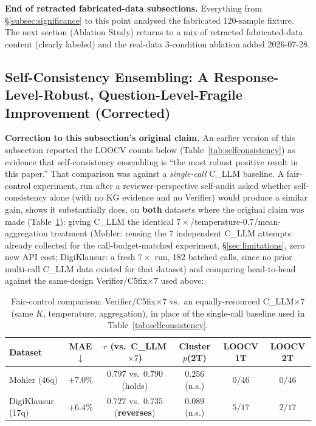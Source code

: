 \documentclass[conference]{IEEEtran}
\begin{document}
\textbf{End of retracted fabricated-data subsections.} Everything from
\S\ref{subsec:significance} to this point analysed the fabricated
120-sample fixture. The next section (Ablation Study) returns to a mix
of retracted fabricated-data content (clearly labeled) and the real-data
3-condition ablation added 2026-07-28.

\subsection{Self-Consistency Ensembling: A Response-Level-Robust, Question-Level-Fragile Improvement (Corrected)}
\label{subsec:selfconsistency}

\textbf{Correction to this subsection's original claim.} An earlier
version of this subsection reported the LOOCV counts below
(Table~\ref{tab:selfconsistency}) as evidence that self-consistency
ensembling is ``the most robust positive result in this paper.'' That
comparison was against a \emph{single-call} C\_LLM baseline. A
fair-control experiment, run after a reviewer-perspective self-audit
asked whether self-consistency alone (with no KG evidence and no
Verifier) would produce a similar gain, shows it substantially does, on
\textbf{both} datasets where the original claim was made
(Table~\ref{tab:faircontrol}): giving C\_LLM the identical
$7\times$/temperature-$0.7$/mean-aggregation treatment (Mohler: reusing
the 7 independent C\_LLM attempts already collected for the
call-budget-matched experiment, \S\ref{sec:limitations}, zero new API
cost; DigiKlausur: a fresh $7\times$ run, 182 batched calls, since no
prior multi-call C\_LLM data existed for that dataset) and comparing
head-to-head against the same-design Verifier/C5fix$\times7$ used
above:

\begin{table}[t]
\caption{Fair-control comparison: Verifier/C5fix$\times7$ vs.\ an
equally-resourced C\_LLM$\times7$ (same $K$, temperature, aggregation),
in place of the single-call baseline used in Table~\ref{tab:selfconsistency}.}
\label{tab:faircontrol}
\centering
\footnotesize
\setlength{\tabcolsep}{3pt}
\begin{tabular}{lccccc}
\toprule
\textbf{Dataset} & MAE$\downarrow$ & $r$ (vs.\ C\_LLM$\times7$) & Cluster $p$(2T) & LOOCV 1T & LOOCV 2T \\
\midrule
Mohler (46q)      & $+7.0\%$ & $0.797$ vs.\ $0.790$ (holds) & $0.256$ (n.s.) & $0/46$ & $0/46$ \\
DigiKlausur (17q) & $+6.4\%$ & $0.727$ vs.\ $0.735$ (\textbf{reverses}) & $0.089$ (n.s.) & $5/17$ & $2/17$ \\
\bottomrule
\end{tabular}
\end{table}
\end{document}
